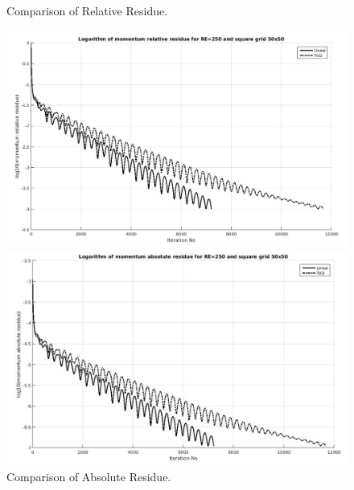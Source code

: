 \documentclass[12pt]{elsarticle}
\begin{document}
	\begin{figure}[h]
		\caption{Comparison of Relative Residue.}
		\centering\includegraphics[width=1.0\linewidth]{23_rr_tvd_linear_re_250_50_50}
		\caption{Comparison of Absolute Residue.}
		\centering\includegraphics[width=1.0\linewidth]{24_ar_tvd_linear_re_250_50_50}
	\end{figure}
	\clearpage
	
	
	
\end{document}
